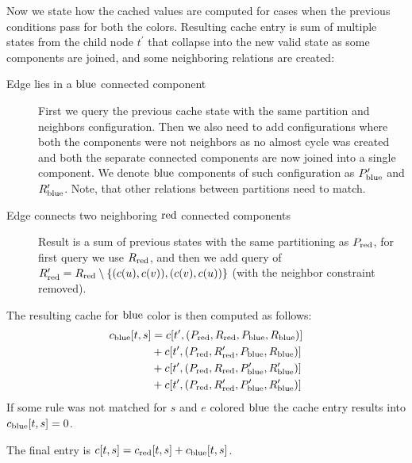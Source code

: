 Now we state how the cached values are computed for cases when
the previous conditions pass for both the colors.
Resulting cache entry is sum of multiple states from the child node
\( t^\prime \) that collapse into the new valid state
as some components are joined,
and some neighboring relations are created:
%
\begin{description}
	\item[Edge lies in a \( \text{blue} \) connected component]
	      First we query the previous cache state with
	      the same partition and neighbors configuration.
	      Then we also need to add configurations where
	      both the components were not neighbors as no almost cycle was created
	      and both the separate connected components
	      are now joined into a single component.
	      We denote \( \text{blue} \) components of such configuration
	      as \( P_{\text{blue}}^\prime \) and \( R_{\text{blue}}^\prime \).
	      Note, that other relations between partitions need to match.
	\item[Edge connects two neighboring \( \text{red} \) connected components]
	      Result is a sum of previous states with the same partitioning as \( P_{\text{red}} \),
	      for first query we use \( R_{\text{red}} \),
	      and then we add query of \( R^\prime_{\text{red}} = R_{\text{red}} \setminus \{(c(u), c(v)), (c(v), c(u))\} \)
	      (with the neighbor constraint removed).
\end{description}
%

The resulting cache for \( \text{blue} \) color is then computed as follows:
%
\begin{align*}
	c_{\text{blue}}[t, s] & = c[t^\prime, (P_{\text{red}}, R_{\text{red}}, P_{\text{blue}}, R_{\text{blue}})]                      \\
	              & + c[t^\prime, (P_{\text{red}}, R_{\text{red}}^\prime, P_{\text{blue}}, R_{\text{blue}})]               \\
	              & + c[t^\prime, (P_{\text{red}}, R_{\text{red}}, P_{\text{blue}}^\prime, R_{\text{blue}}^\prime)]        \\
	              & + c[t^\prime, (P_{\text{red}}, R_{\text{red}}^\prime, P_{\text{blue}}^\prime, R_{\text{blue}}^\prime)]
\end{align*}
%
If some rule was not matched for \( s \) and \( e \) colored \( \text{blue} \)
the cache entry results into \( c_{\text{blue}}[t, s] = 0 \).

The final entry is \( c[t, s] = c_{\text{red}}[t, s] + c_{\text{blue}}[t, s] \).

\subsection{\JoinNode}


